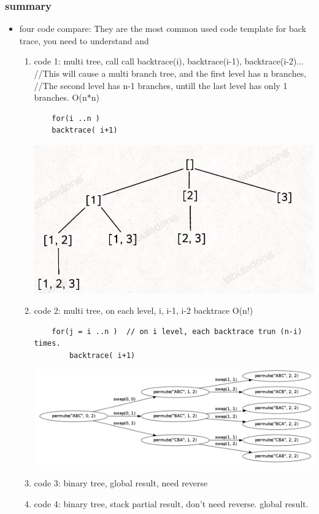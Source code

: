 \documentclass[a4paper,11pt,twoside]{book}
\begin{document}
\subsubsection{summary}
\begin{itemize}
	
	\item four code compare: They are the most common used code template for back trace, you need to understand and 
\begin{enumerate}
	\item code 1: multi tree, call  call backtrace(i),  backtrace(i-1), backtrace(i-2)... //This will cause a multi branch tree, and the first level has n branches, 
	//The second level has n-1 branches, untill the last level has only 1 branches.   O(n*n)
\begin{lstlisting}
	for(i ..n )
	backtrace( i+1)
\end{lstlisting}
	
	\begin{center}
		\includegraphics[width=0.7\linewidth]{pics/sub}
	\end{center}
	
	\item code 2: multi tree, on each level,  i, i-1,  i-2 backtrace O(n!)
\begin{lstlisting}
	for(j = i ..n )  // on i level, each backtrace trun (n-i) times. 
		backtrace( i+1)
\end{lstlisting}

	\includegraphics[scale=0.25]{pics/permutation.png}

	\item code 3: binary tree, global result, need reverse
	
	\item code 4: binary tree, stack partial result, don't need reverse. global result.
\end{enumerate}

\end{itemize}
\end{document}

